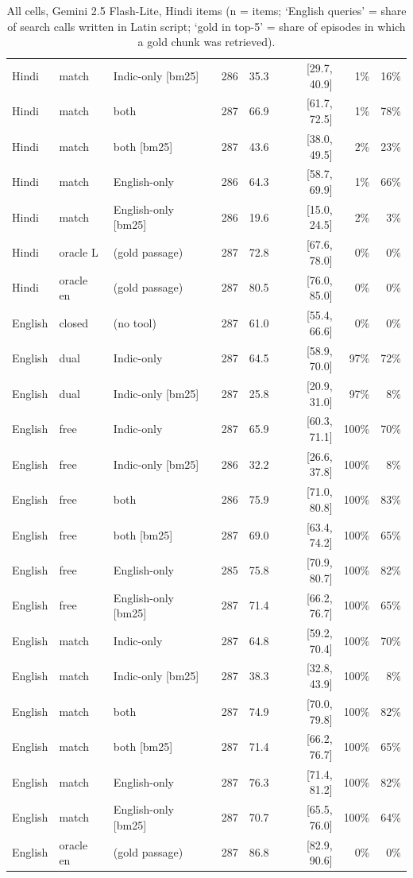 \begin{table}[h]
\begin{tabular}{lllrrrrr}
Hindi & match & Indic-only [bm25] & 286 & 35.3 & [29.7, 40.9] & 1\% & 16\% \\
Hindi & match & both & 287 & 66.9 & [61.7, 72.5] & 1\% & 78\% \\
Hindi & match & both [bm25] & 287 & 43.6 & [38.0, 49.5] & 2\% & 23\% \\
Hindi & match & English-only & 286 & 64.3 & [58.7, 69.9] & 1\% & 66\% \\
Hindi & match & English-only [bm25] & 286 & 19.6 & [15.0, 24.5] & 2\% & 3\% \\
Hindi & oracle L & (gold passage) & 287 & 72.8 & [67.6, 78.0] & 0\% & 0\% \\
Hindi & oracle en & (gold passage) & 287 & 80.5 & [76.0, 85.0] & 0\% & 0\% \\
English & closed & (no tool) & 287 & 61.0 & [55.4, 66.6] & 0\% & 0\% \\
English & dual & Indic-only & 287 & 64.5 & [58.9, 70.0] & 97\% & 72\% \\
English & dual & Indic-only [bm25] & 287 & 25.8 & [20.9, 31.0] & 97\% & 8\% \\
English & free & Indic-only & 287 & 65.9 & [60.3, 71.1] & 100\% & 70\% \\
English & free & Indic-only [bm25] & 286 & 32.2 & [26.6, 37.8] & 100\% & 8\% \\
English & free & both & 286 & 75.9 & [71.0, 80.8] & 100\% & 83\% \\
English & free & both [bm25] & 287 & 69.0 & [63.4, 74.2] & 100\% & 65\% \\
English & free & English-only & 285 & 75.8 & [70.9, 80.7] & 100\% & 82\% \\
English & free & English-only [bm25] & 287 & 71.4 & [66.2, 76.7] & 100\% & 65\% \\
English & match & Indic-only & 287 & 64.8 & [59.2, 70.4] & 100\% & 70\% \\
English & match & Indic-only [bm25] & 287 & 38.3 & [32.8, 43.9] & 100\% & 8\% \\
English & match & both & 287 & 74.9 & [70.0, 79.8] & 100\% & 82\% \\
English & match & both [bm25] & 287 & 71.4 & [66.2, 76.7] & 100\% & 65\% \\
English & match & English-only & 287 & 76.3 & [71.4, 81.2] & 100\% & 82\% \\
English & match & English-only [bm25] & 287 & 70.7 & [65.5, 76.0] & 100\% & 64\% \\
English & oracle en & (gold passage) & 287 & 86.8 & [82.9, 90.6] & 0\% & 0\% \\
\bottomrule
\end{tabular}
\caption{All cells, Gemini 2.5 Flash-Lite, Hindi items (n = items; `English queries' = share of search calls written in Latin script; `gold in top-5' = share of episodes in which a gold chunk was retrieved).}
\end{table}


